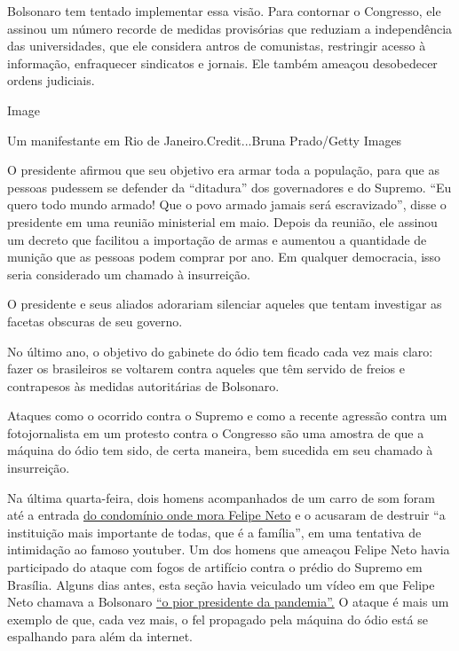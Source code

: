 Bolsonaro tem tentado implementar essa visão. Para contornar o
Congresso, ele assinou um número recorde de medidas provisórias que
reduziam a independência das universidades, que ele considera antros de
comunistas, restringir acesso à informação, enfraquecer sindicatos e
jornais. Ele também ameaçou desobedecer ordens judiciais.

Image

Um manifestante em Rio de Janeiro.Credit...Bruna Prado/Getty Images

O presidente afirmou que seu objetivo era armar toda a população, para
que as pessoas pudessem se defender da ``ditadura'' dos governadores e
do Supremo. ``Eu quero todo mundo armado! Que o povo armado jamais será
escravizado'', disse o presidente em uma reunião ministerial em maio.
Depois da reunião, ele assinou um decreto que facilitou a importação de
armas e aumentou a quantidade de munição que as pessoas podem comprar
por ano. Em qualquer democracia, isso seria considerado um chamado à
insurreição.

O presidente e seus aliados adorariam silenciar aqueles que tentam
investigar as facetas obscuras de seu governo.

No último ano, o objetivo do gabinete do ódio tem ficado cada vez mais
claro: fazer os brasileiros se voltarem contra aqueles que têm servido
de freios e contrapesos às medidas autoritárias de Bolsonaro.

Ataques como o ocorrido contra o Supremo e como a recente agressão
contra um fotojornalista em um protesto contra o Congresso são uma
amostra de que a máquina do ódio tem sido, de certa maneira, bem
sucedida em seu chamado à insurreição.

Na última quarta-feira, dois homens acompanhados de um carro de som
foram até a entrada
\href{https://esportes.yahoo.com/noticias/aliados-jair-bolsonaro-atacam-casa-felipe-neto-010129218.html}{do
condomínio onde mora Felipe Neto} e o acusaram de destruir ``a
instituição mais importante de todas, que é a família'', em uma
tentativa de intimidação ao famoso youtuber. Um dos homens que ameaçou
Felipe Neto havia participado do ataque com fogos de artifício contra o
prédio do Supremo em Brasília. Alguns dias antes, esta seção havia
veiculado um vídeo em que Felipe Neto chamava a Bolsonaro
\href{https://www.nytimes.com/2020/07/15/opinion/coronavirus-covid-brazil-bolsonaro.html}{``o
pior presidente da pandemia''.} O ataque é mais um exemplo de que, cada
vez mais, o fel propagado pela máquina do ódio está se espalhando para
além da internet.

